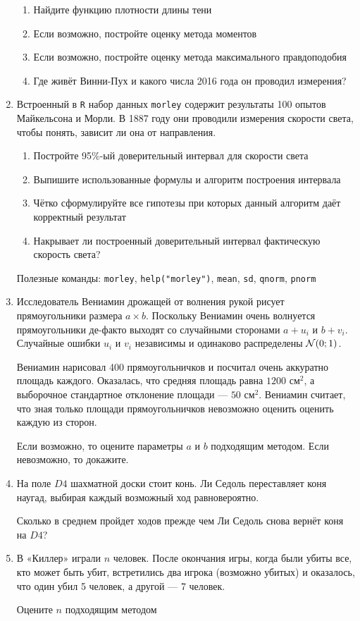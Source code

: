 \begin{enumerate}
\begin{enumerate}
\item Найдите функцию плотности длины тени
\item Если возможно, постройте оценку метода моментов
\item Если возможно, постройте оценку метода максимального правдоподобия
\item Где живёт Винни-Пух и какого числа 2016 года он проводил измерения?
\end{enumerate}

\item Встроенный в \verb|R| набор данных \verb|morley| содержит результаты 100 опытов Майкельсона и Морли. В 1887 году они проводили измерения скорости света, чтобы понять, зависит ли она от направления.

\begin{enumerate}
\item Постройте 95\%-ый доверительный интервал для скорости света
\item Выпишите использованные формулы и алгоритм построения интервала
\item Чётко сформулируйте все гипотезы при которых данный алгоритм даёт корректный результат
\item Накрывает ли построенный доверительный интервал фактическую скорость света?
\end{enumerate}

Полезные команды: \verb|morley|, \verb|help("morley")|, \verb|mean|, \verb|sd|, \verb|qnorm|, \verb|pnorm|



\item  Исследователь Вениамин дрожащей от волнения рукой рисует прямоугольники размера $a\times b$. Поскольку Вениамин очень волнуется прямоугольники де-факто выходят со случайными сторонами $a+u_i$ и $b+v_i$. Случайные ошибки $u_i$ и $v_i$ независимы и одинаково распределены $\mathcal{N}(0;1)$.

Вениамин нарисовал 400 прямоугольничков и посчитал очень аккуратно площадь каждого. Оказалась, что средняя площадь равна $1200$ см$^2$, а выборочное стандартное отклонение площади — $50$ см$^2$. Вениамин считает, что зная только площади прямоугольничков невозможно оценить оценить каждую из сторон.

Если возможно, то оцените параметры $a$ и $b$ подходящим методом. Если невозможно, то докажите.

\item На поле $D4$ шахматной доски стоит конь. Ли Седоль переставляет коня наугад, выбирая каждый возможный ход равновероятно.

Сколько в среднем пройдет ходов прежде чем Ли Седоль снова вернёт коня на $D4$?

\item В «Киллер» играли $n$ человек. После окончания игры, когда были убиты все, кто может быть убит, встретились два игрока (возможно убитых) и оказалось, что один убил 5 человек, а другой — 7 человек.

Оцените $n$ подходящим методом
\end{enumerate}


